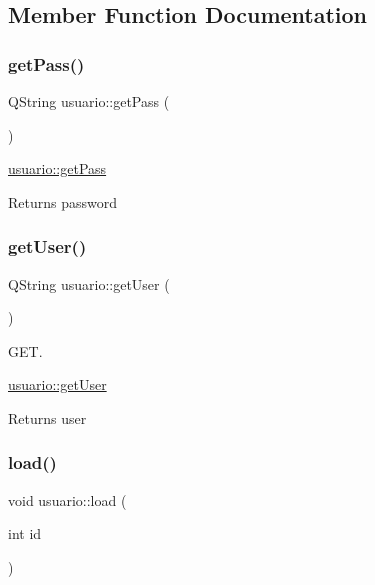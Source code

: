 \subsection{Member Function Documentation}
\mbox{\label{classusuario_ac0a46c5a79d3c3f70fb71383522b5e44}} 
\subsubsection{\texorpdfstring{get\+Pass()}{getPass()}}
{\footnotesize\ttfamily Q\+String usuario\+::get\+Pass (\begin{DoxyParamCaption}{ }\end{DoxyParamCaption})}



\mbox{\hyperlink{classusuario_ac0a46c5a79d3c3f70fb71383522b5e44}{usuario\+::get\+Pass}} 

\begin{DoxyReturn}{Returns}
password 
\end{DoxyReturn}
\mbox{\label{classusuario_afb7157be3eac41daf4e633ce376ac8a0}} 
\subsubsection{\texorpdfstring{get\+User()}{getUser()}}
{\footnotesize\ttfamily Q\+String usuario\+::get\+User (\begin{DoxyParamCaption}{ }\end{DoxyParamCaption})}



G\+ET. 

\mbox{\hyperlink{classusuario_afb7157be3eac41daf4e633ce376ac8a0}{usuario\+::get\+User}} \begin{DoxyReturn}{Returns}
user 
\end{DoxyReturn}
\mbox{\label{classusuario_a882737e5daa0544a3581b182645e7870}} 
\subsubsection{\texorpdfstring{load()}{load()}}
{\footnotesize\ttfamily void usuario\+::load (\begin{DoxyParamCaption}\item[{int}]{id }\end{DoxyParamCaption})}



